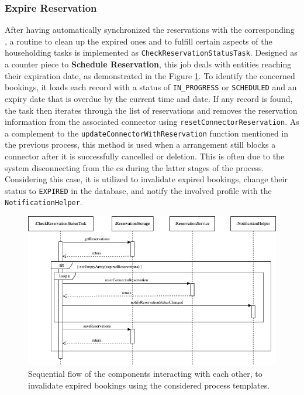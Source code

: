 \newpage

\subsubsection{Expire Reservation}
\label{ch:Implementation:sec:Reservation System:ssec:Scheduling Capabilities:sssec:Expire Reservation}

After having automatically synchronized the reservations with the corresponding , a routine to clean up the expired ones and to fulfill certain aspects of the householding tasks is implemented as \texttt{CheckReservationStatusTask}.
Designed as a counter piece to \textbf{Schedule Reservation}, this job deals with entities reaching their expiration date, as demonstrated in the Figure \ref{fig:expire-reservation-seqflow}.
To identify the concerned bookings, it loads each record with a status of \texttt{IN\_PROGRESS} or \texttt{SCHEDULED} and an expiry date that is overdue by the current time and date.
If any record is found, the task then iterates through the list of reservations and removes the reservation information from the associated connector using \texttt{resetConnectorReservation}. 
As a complement to the \texttt{updateConnectorWithReservation} function mentioned in the previous process, this method is used when a arrangement still blocks a connector after it is successfully cancelled or deletion. This is often due to the system disconnecting from the \acrshort{cs} during the latter stages of the process.
Considering this case, it is utilized to invalidate expired bookings, change their status to \texttt{EXPIRED} in the database, and notify the involved profile with the \texttt{NotificationHelper}.

\begin{figure}[h]
    \centering
    \includegraphics[scale=0.5]{resources/images/main/6_implementation/processes/scheduler/UpdateExpiredReservations.png}
    \caption{Sequential flow of the components interacting with each other, to invalidate expired bookings using the considered process templates.}
    \label{fig:expire-reservation-seqflow}
\end{figure}

